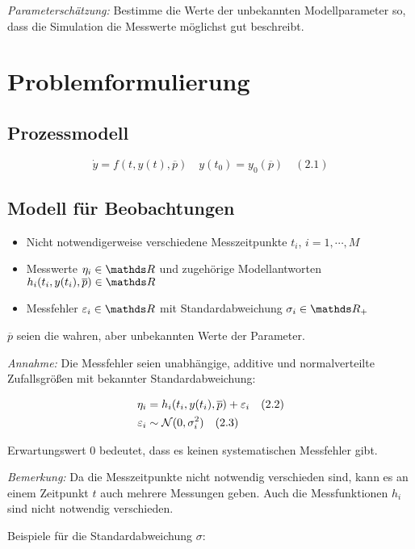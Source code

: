 
\emph{Parameterschätzung:} Bestimme die Werte der unbekannten Modellparameter so, dass die Simulation die Messwerte möglichst gut beschreibt.

\section*{Problemformulierung}

\subsection*{Prozessmodell}

\[\dot y = f(t,y(t),\overline p) \quad y(t_0) = y_0(\overline p) \quad (2.1)\]

\subsection*{Modell für Beobachtungen}

\begin{itemize}
\item Nicht notwendigerweise verschiedene Messzeitpunkte $t_i$, $i=1,\cdots,M$
\item Messwerte $\eta_i \in \R$ und zugehörige Modellantworten $h_i (t_i, y(t_i), \overline p) \in \R$
\item Messfehler $\eps_i \in \R$ mit Standardabweichung $\sigma_i \in \R_+$
\end{itemize}

$\overline p$ seien die wahren, aber unbekannten Werte der Parameter.

\emph{Annahme:} Die Messfehler seien unabhängige, additive und normalverteilte Zufallsgrößen mit bekannter Standardabweichung:

\begin{align*}
\eta_i &= h_i(t_i, y(t_i), \overline p) + \varepsilon_i \quad (2.2) \\
\varepsilon_i &\sim \mathcal N(0, \sigma_i^2) \quad (2.3)
\end{align*}

Erwartungswert $0$ bedeutet, dass es keinen systematischen Messfehler gibt.

\emph{Bemerkung:} Da die Messzeitpunkte nicht notwendig verschieden sind, kann es an einem Zeitpunkt $t$ auch mehrere Messungen geben. Auch die Messfunktionen $h_i$ sind nicht notwendig verschieden.

Beispiele für die Standardabweichung $\sigma:$

